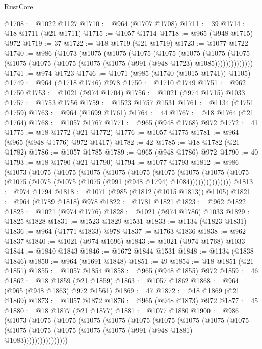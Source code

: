 \begin{lexlean}{RustCore}
\begin{coremodule}
@1708 := @1022 @1127
@1710 := @964 (@1707 @1708)
@1711 := 39
@1714 := @18 @1711 (@21 @1711)
@1715 := @1057 @1714
@1718 := @965 (@948 @1715) @972
@1719 := 37
@1722 := @18 @1719 (@21 @1719)
@1723 := @1077 @1722
@1740 := @986
    (@1073
      (@1075
        (@1075
          (@1075
            (@1075
              (@1075
                (@1075
                  (@1075 (@1075 (@1075 (@1075 (@1075 (@1075 (@991 (@948 @1723) @1085))))))))))))))
@1741 := @974 @1723
@1746 := @1071 (@985 (@1740 (@1015 @1741)) @1105)
@1749 := @964 (@1718 @1746) @978
@1750 := @1710 @1749
@1751 := @962 @1750
@1753 := @1021 (@974 @1704)
@1756 := @1021 (@974 @1715) @1033
@1757 := @1753 @1756
@1759 := @1523 @1757 @1531
@1761 := @1134 (@1751 @1759)
@1763 := @964 (@1699 @1761)
@1764 := 44
@1767 := @18 @1764 (@21 @1764)
@1768 := @1057 @1767
@1771 := @965 (@948 @1768) @972
@1772 := 41
@1775 := @18 @1772 (@21 @1772)
@1776 := @1057 @1775
@1781 := @964 (@965 (@948 @1776) @972 @1417)
@1782 := 42
@1785 := @18 @1782 (@21 @1782)
@1786 := @1057 @1785
@1789 := @965 (@948 @1786) @972
@1790 := 40
@1793 := @18 @1790 (@21 @1790)
@1794 := @1077 @1793
@1812 := @986
    (@1073
      (@1075
        (@1075
          (@1075
            (@1075
              (@1075
                (@1075
                  (@1075
                    (@1075
                      (@1075 (@1075 (@1075 (@1075 (@1075 (@991 (@948 @1794) @1084)))))))))))))))
@1813 := @974 @1794
@1818 := @1071 (@985 (@1812 (@1015 @1813)) @1105)
@1821 := @964 (@1789 @1818) @978
@1822 := @1781 @1821
@1823 := @962 @1822
@1825 := @1021 (@974 @1776)
@1828 := @1021 (@974 @1786) @1033
@1829 := @1825 @1828
@1831 := @1523 @1829 @1531
@1833 := @1134 (@1823 @1831)
@1836 := @964 (@1771 @1833) @978
@1837 := @1763 @1836
@1838 := @962 @1837
@1840 := @1021 (@974 @1696)
@1843 := @1021 (@974 @1768) @1033
@1844 := @1840 @1843
@1846 := @1672 @1844 @1531
@1848 := @1134 (@1838 @1846)
@1850 := @964 (@1691 @1848)
@1851 := 49
@1854 := @18 @1851 (@21 @1851)
@1855 := @1057 @1854
@1858 := @965 (@948 @1855) @972
@1859 := 46
@1862 := @18 @1859 (@21 @1859)
@1863 := @1057 @1862
@1868 := @964 (@965 (@948 @1863) @972 @1561)
@1869 := 47
@1872 := @18 @1869 (@21 @1869)
@1873 := @1057 @1872
@1876 := @965 (@948 @1873) @972
@1877 := 45
@1880 := @18 @1877 (@21 @1877)
@1881 := @1077 @1880
@1900 := @986
    (@1073
      (@1075
        (@1075
          (@1075
            (@1075
              (@1075
                (@1075
                  (@1075
                    (@1075
                      (@1075
                        (@1075 (@1075 (@1075 (@1075 (@1075 (@991 (@948 @1881) @1083))))))))))))))))

\end{coremodule}
\end{lexlean}
